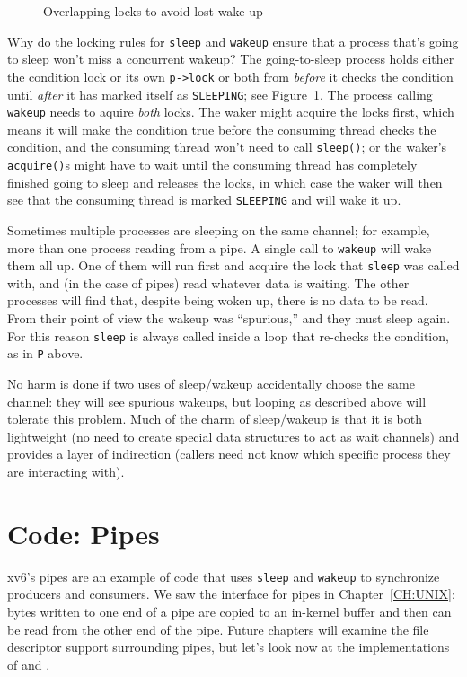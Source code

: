 \begin{figure}[t]
  
  \caption{Overlapping locks to avoid lost wake-up}
    \label{fig:overlap}
\end{figure}

Why do the locking rules for 
\lstinline{sleep}
and
\lstinline{wakeup}
ensure that a process that's going to sleep
won't miss a concurrent wakeup?
The going-to-sleep process holds either
the condition lock or its own
\lstinline{p->lock} 
or both from {\it before} it checks the condition
until {\it after} it has marked itself as \texttt{SLEEPING};
see Figure~\ref{fig:overlap}.
The process calling \texttt{wakeup} needs to aquire \textit{both}
locks.
The waker might acquire the locks first, which means
it will make the condition true before the consuming
thread checks the condition, and the consuming thread
won't need to call {\tt sleep()};
or the waker's {\tt acquire()}s might have to wait until the consuming
thread has completely finished going to sleep and
releases the locks, in which case the waker will then see
that the consuming thread is marked {\tt SLEEPING}
and will wake it up.

Sometimes multiple processes are sleeping
on the same channel; for example, more than one process
reading from a pipe.
A single call to 
\lstinline{wakeup}
will wake them all up.
One of them will run first and acquire the lock that
\lstinline{sleep}
was called with, and (in the case of pipes) read whatever
data is waiting.
The other processes will find that, despite being woken up,
there is no data to be read.
From their point of view the wakeup was ``spurious,'' and
they must sleep again.
For this reason \lstinline{sleep} is always called inside a loop that
re-checks the condition, as in \lstinline{P} above.

No harm is done if two uses of sleep/wakeup accidentally
choose the same channel: they will see spurious wakeups,
but looping as described above will tolerate this problem.
Much of the charm of sleep/wakeup is that it is both
lightweight (no need to create special data
structures to act as wait channels) and provides a layer
of indirection (callers need not know which specific process
they are interacting with).
\section{Code: Pipes}
xv6's pipes are an example of code that uses
\lstinline{sleep}
and \lstinline{wakeup} to synchronize producers and
consumers.
We saw the interface for pipes in Chapter~\ref{CH:UNIX}:
bytes written to one end of a pipe are copied
to an in-kernel buffer and then can be read from
the other end of the pipe.
Future chapters will examine the file descriptor support
surrounding pipes, but let's look now at the
implementations of 
and
.


